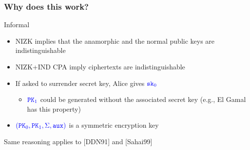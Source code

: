 \documentclass[]{beamer}
\newcommand{\objfont}[1]{{\mathtt{#1}}}
\newcommand{\pk}{\objfont{PK}}      %
\newcommand{\sk}{\objfont{sk}}      %
\begin{document}
\begin{frame}
\frametitle{Why does this work?}
\begin{block}{Informal}
\begin{itemize}
\item {\color{brown} NIZK} implies that  the 
    anamorphic and the normal {\color{blue} public keys}
        are indistinguishable
\item {\color{brown} NIZK+IND CPA} imply ciphertexts are indistinguishable 
\item If asked to surrender secret key, Alice gives $\color{blue} \sk_0$
    \begin{itemize}
        \item $\color{blue} \pk_1$ could be generated without the associated secret key
            (e.g., El Gamal has this property)
    \end{itemize}
\item $\color{blue} (\pk_0,\pk_1,\Sigma,\mathtt{aux})$ is a symmetric encryption key
\end{itemize}
\end{block}

\vfill
\color{brown}
Same reasoning applies to [DDN91] and [Sahai99]

\end{frame}
\end{document}
